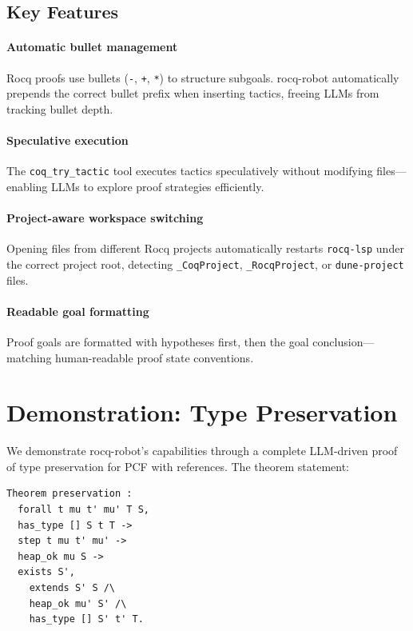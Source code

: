 \documentclass[sigconf,screen,nonacm]{acmart}
\begin{document}
\subsection{Key Features}

\paragraph{Automatic bullet management}
Rocq proofs use bullets (\texttt{-}, \texttt{+}, \texttt{*}) to structure subgoals. rocq-robot automatically prepends the correct bullet prefix when inserting tactics, freeing LLMs from tracking bullet depth.

\paragraph{Speculative execution}
The \texttt{coq\_try\_tactic} tool executes tactics speculatively without modifying files—enabling LLMs to explore proof strategies efficiently.

\paragraph{Project-aware workspace switching}
Opening files from different Rocq projects automatically restarts \texttt{rocq-lsp} under the correct project root, detecting \texttt{\_CoqProject}, \texttt{\_RocqProject}, or \texttt{dune-project} files.

\paragraph{Readable goal formatting}
Proof goals are formatted with hypotheses first, then the goal conclusion—matching human-readable proof state conventions.

\section{Demonstration: Type Preservation}

We demonstrate rocq-robot's capabilities through a complete LLM-driven proof of type preservation for PCF with references. The theorem statement:

\begin{lstlisting}[basicstyle=\footnotesize\ttfamily]
Theorem preservation : 
  forall t mu t' mu' T S,
  has_type [] S t T -> 
  step t mu t' mu' ->
  heap_ok mu S ->
  exists S', 
    extends S' S /\ 
    heap_ok mu' S' /\ 
    has_type [] S' t' T.
\end{lstlisting}
\end{document}
